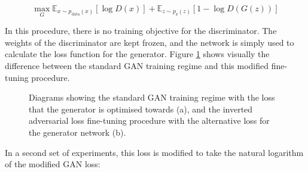 \begin{equation} 
  \max_{G}\mathbb{E}_{x\sim p_{\text{data}}(x)}[\log{D(x)}] +  \mathbb{E}_{z\sim p_{\text{z}}(z)}[1 - \log{D(G(z))}]
  \label{eq:inverted-adv-loss}
  \end{equation}

In this procedure, there is no training objective for the discriminator. 
The weights of the discriminator are kept frozen, and the network is simply used to calculate the loss function for the generator.
Figure \ref{fig:c4:gan-diagrams} shows visually the difference between the standard GAN training regime and this modified fine-tuning procedure. 

\begin{figure}[!htbp]
  \centering
  \hfill
  \caption[Adversarial and inverted adversarial loss diagram]{Diagrams showing the standard GAN training regime with the loss that the generator is optimised towards (a), and the inverted adversarial loss fine-tuning procedure with the alternative loss for the generator network (b).}
  \label{fig:c4:gan-diagrams}
\end{figure}

In a second set of experiments, this loss is modified to take the natural logarithm of the modified GAN loss:

